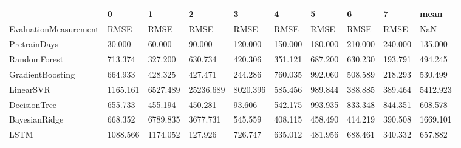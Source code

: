 \begin{tabular}{llllllllll}
\toprule
{} &        0 &        1 &         2 &        3 &       4 &       5 &       6 &       7 &     mean \\
\midrule
EvaluationMeasurement &     RMSE &     RMSE &      RMSE &     RMSE &    RMSE &    RMSE &    RMSE &    RMSE &      NaN \\
PretrainDays          &   30.000 &   60.000 &    90.000 &  120.000 & 150.000 & 180.000 & 210.000 & 240.000 &  135.000 \\
RandomForest          &  713.374 &  327.200 &   630.734 &  420.306 & 351.121 & 687.200 & 630.230 & 193.791 &  494.245 \\
GradientBoosting      &  664.933 &  428.325 &   427.471 &  244.286 & 760.035 & 992.060 & 508.589 & 218.293 &  530.499 \\
LinearSVR             & 1165.161 & 6527.489 & 25236.689 & 8020.396 & 585.456 & 989.844 & 388.885 & 389.464 & 5412.923 \\
DecisionTree          &  655.733 &  455.194 &   450.281 &   93.606 & 542.175 & 993.935 & 833.348 & 844.351 &  608.578 \\
BayesianRidge         &  668.352 & 6789.835 &  3677.731 &  545.559 & 408.115 & 458.490 & 414.219 & 390.508 & 1669.101 \\
LSTM                  & 1088.566 & 1174.052 &   127.926 &  726.747 & 635.012 & 481.956 & 688.461 & 340.332 &  657.882 \\
\bottomrule
\end{tabular}
